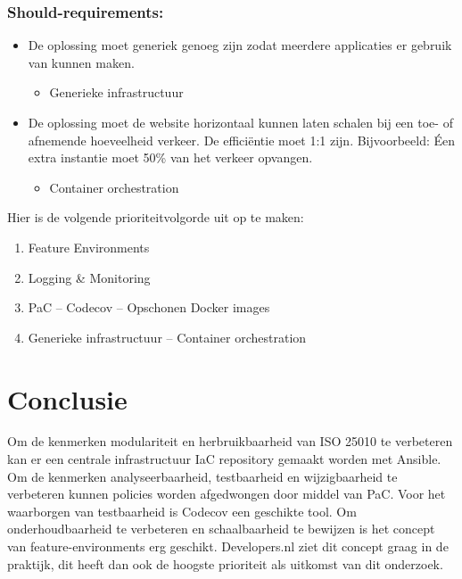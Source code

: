 \subsubsection{Should-requirements:}
\begin{itemize}
	\item De oplossing moet generiek genoeg zijn zodat meerdere applicaties er gebruik van kunnen maken.
	\begin{itemize}
		\item Generieke infrastructuur
	\end{itemize}

	\item De oplossing moet de website horizontaal kunnen laten schalen bij een toe- of afnemende hoeveelheid verkeer. De efficiëntie moet 1:1 zijn. Bijvoorbeeld: Éen extra instantie moet 50\% van het verkeer opvangen.
	\begin{itemize}
		\item Container orchestration
	\end{itemize}
\end{itemize}
Hier is de volgende prioriteitvolgorde uit op te maken:
\begin{enumerate}
    \item Feature Environments
    \item Logging \& Monitoring
    \item PaC -- Codecov -- Opschonen Docker images
    \item Generieke infrastructuur -- Container orchestration
\end{enumerate}

\section{Conclusie}
Om de kenmerken modulariteit en herbruikbaarheid van ISO 25010 te verbeteren kan er een centrale infrastructuur IaC repository gemaakt worden met Ansible. Om de kenmerken analyseerbaarheid, testbaarheid en wijzigbaarheid te verbeteren kunnen policies worden afgedwongen door middel van PaC. Voor het waarborgen van testbaarheid is Codecov een geschikte tool. Om onderhoudbaarheid te verbeteren en schaalbaarheid te bewijzen is het concept van feature-environments erg geschikt. Developers.nl ziet dit concept graag in de praktijk, dit heeft dan ook de hoogste prioriteit als uitkomst van dit onderzoek.